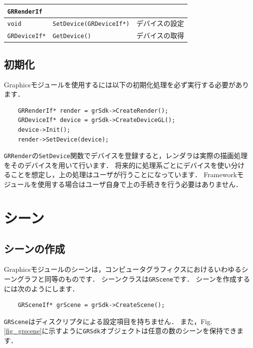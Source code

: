 \begin{center}
\begin{tabular}{p{.2\hsize}p{.40\hsize}p{.3\hsize}}
\texttt{GRRenderIf}		&									&	\\ \midrule
\texttt{void}			& \texttt{SetDevice(GRDeviceIf*)}	& \KLUDGE デバイスの設定	\\
\texttt{GRDeviceIf*} 	& \texttt{GetDevice()}				& \KLUDGE デバイスの取得	\\
\end{tabular}
\end{center}

\subsection*{\KLUDGE 初期化}

Graphics\KLUDGE モジュールを使用するには以下の初期化処理を必ず実行する必要があります．
\begin{verbatim}
   	GRRenderIf* render = grSdk->CreateRender();
    GRDeviceIf* device = grSdk->CreateDeviceGL();
    device->Init();
    render->SetDevice(device);
\end{verbatim}
\texttt{GRRender}\KLUDGE の\texttt{SetDevice}\KLUDGE 関数でデバイスを登録すると，レンダラは実際の描画処理をそのデバイスを用いて行います．
\KLUDGE 将来的に処理系ごとにデバイスを使い分けることを想定し，上の処理はユーザが行うことになっています．
Framework\KLUDGE モジュールを使用する場合はユーザ自身で上の手続きを行う必要はありません．

\section{\KLUDGE シーン}
\label{sec_grscene}

\subsection*{\KLUDGE シーンの作成}

Graphics\KLUDGE モジュールのシーンは，コンピュータグラフィクスにおけるいわゆるシーングラフと同等のものです．
\KLUDGE シーンクラスは\texttt{GRScene}\KLUDGE です．
\KLUDGE シーンを作成するには次のようにします．
\begin{verbatim}
    GRSceneIf* grScene = grSdk->CreateScene();
\end{verbatim}
\texttt{GRScene}\KLUDGE はディスクリプタによる設定項目を持ちません．
\KLUDGE また，Fig.\,\ref{fig_grscene}\KLUDGE に示すように\texttt{GRSdk}\KLUDGE オブジェクトは任意の数のシーンを保持できます．

